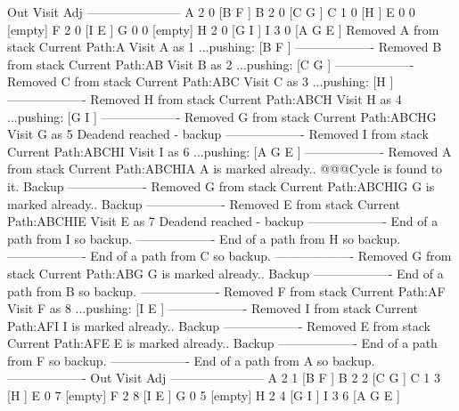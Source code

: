   Out Visit Adj
-----------------------
A 2     0 [B F ]
B 2     0 [C G ]
C 1     0 [H ]
E 0     0 [empty]
F 2     0 [I E ]
G 0     0 [empty]
H 2     0 [G I ]
I 3     0 [A G E ]
Removed A from stack
Current Path:A
Visit A as 1
...pushing: [B F ]
-------------------
Removed B from stack
Current Path:AB
Visit B as 2
...pushing: [C G ]
-------------------
Removed C from stack
Current Path:ABC
Visit C as 3
...pushing: [H ]
-------------------
Removed H from stack
Current Path:ABCH
Visit H as 4
...pushing: [G I ]
-------------------
Removed G from stack
Current Path:ABCHG
Visit G as 5
 Deadend reached - backup
-------------------
Removed I from stack
Current Path:ABCHI
Visit I as 6
...pushing: [A G E ]
-------------------
Removed A from stack
Current Path:ABCHIA
A is marked already..
@@@Cycle is found to it.
Backup
-------------------
Removed G from stack
Current Path:ABCHIG
G is marked already..
Backup
-------------------
Removed E from stack
Current Path:ABCHIE
Visit E as 7
 Deadend reached - backup
-------------------
End of a path from I so backup.
-------------------
End of a path from H so backup.
-------------------
End of a path from C so backup.
-------------------
Removed G from stack
Current Path:ABG
G is marked already..
Backup
-------------------
End of a path from B so backup.
-------------------
Removed F from stack
Current Path:AF
Visit F as 8
...pushing: [I E ]
-------------------
Removed I from stack
Current Path:AFI
I is marked already..
Backup
-------------------
Removed E from stack
Current Path:AFE
E is marked already..
Backup
-------------------
End of a path from F so backup.
-------------------
End of a path from A so backup.
-------------------
  Out Visit Adj
 -----------------------
A 2     1 [B F ]
B 2     2 [C G ]
C 1     3 [H ]
E 0     7 [empty]
F 2     8 [I E ]
G 0     5 [empty]
H 2     4 [G I ]
I 3     6 [A G E ]
